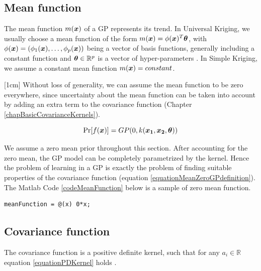 \subsection{Mean function}\label{subSecCH2MeanFunction}
The mean function $m(\boldsymbol{x})$ of a GP represents its trend. In Universal Kriging, we usually choose a mean function of the form $m(\boldsymbol{x}) = \phi(\boldsymbol{x})^{T}\boldsymbol{\theta}$, with $\phi(\boldsymbol{x}) = (\phi_{1}(\boldsymbol{x}), \ldots , \phi_{p}(\boldsymbol{x}))$ being a vector of basis functions, generally including a constant function and $\boldsymbol{\theta} \in \mathbb{R}^{p}$ is a vector of hyper-parameters \cite{matheron1963principles}. In Simple Kriging, we assume a constant mean function $m(\boldsymbol{x}) = constant$.

[1cm]
Without loss of generality, we can assume the mean function to be zero everywhere, since uncertainty about the mean function can be taken into account by adding an extra term to the covariance function (Chapter \ref{chapBasicCovarianceKernels}).  

\begin{equation}\label{equationMeanZeroGPdefinition}
\Pr[f(\boldsymbol{x})] = GP(0 , k(\boldsymbol{x_1}, \boldsymbol{x_2}, \boldsymbol{\theta}))
\end{equation}

We assume a zero mean prior throughout this section. After accounting for the zero mean, the GP model can be completely parametrized by the kernel. Hence the problem of learning in a GP is exactly the problem of finding suitable properties of the covariance function \cite{rasmussen2006gaussian} (equation \ref{equationMeanZeroGPdefinition}). The Matlab Code \ref{codeMeanFunction} below is a sample of zero mean function. 

\begin{mdframed}[hidealllines=true,backgroundcolor=lightgray!20]
\begin{lstlisting}[caption={A zero mean function}, 
                    captionpos=b, 
                    label={codeMeanFunction},
                    style=Matlab-editor, 
                    basicstyle=\color{black}\ttfamily\small,
                    backgroundcolor = \color{MatlabCellColour},
                   ]
% zero mean function
meanFunction = @(x) 0*x; 

\end{lstlisting}
\end{mdframed}

\subsection{Covariance function}\label{subSecCH2Covariance}
The covariance function is a positive definite kernel, such that for any $a_{i} \in \mathbb{R}$ equation \ref{equationPDKernel} holds \cite{Stein1999Springer}.

